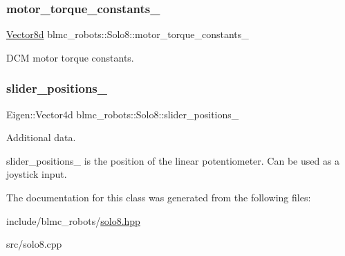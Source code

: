 \subsubsection{\texorpdfstring{motor\+\_\+torque\+\_\+constants\+\_\+}{motor\_torque\_constants\_}}
{\footnotesize\ttfamily \hyperlink{common__header_8hpp_a98975ffbe0bca1296078e0350dfedd60}{Vector8d} blmc\+\_\+robots\+::\+Solo8\+::motor\+\_\+torque\+\_\+constants\+\_\+\hspace{0.3cm}{\ttfamily [private]}}



D\+CM motor torque constants. 

\mbox{\label{classblmc__robots_1_1Solo8_af9d34a00b42e425515d1d7571c59ddca}} 
\subsubsection{\texorpdfstring{slider\+\_\+positions\+\_\+}{slider\_positions\_}}
{\footnotesize\ttfamily Eigen\+::\+Vector4d blmc\+\_\+robots\+::\+Solo8\+::slider\+\_\+positions\+\_\+\hspace{0.3cm}{\ttfamily [private]}}



Additional data. 

slider\+\_\+positions\+\_\+ is the position of the linear potentiometer. Can be used as a joystick input. 

The documentation for this class was generated from the following files\+:\begin{DoxyCompactItemize}
\item 
include/blmc\+\_\+robots/\hyperlink{solo8_8hpp}{solo8.\+hpp}\item 
src/solo8.\+cpp\end{DoxyCompactItemize}
